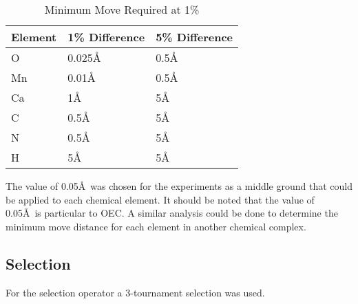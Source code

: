 \begin{table}
\caption{Minimum Move Required at 1\%}
\label{table:minMove}
\centering
\normalsize
\begin{tabular}{ | l | l | l | }
  \hline
    Element & 1\% Difference & 5\% Difference \\ \hline
    O & 0.025\AA & 0.5\AA \\ \hline
    Mn & 0.01\AA & 0.5\AA \\ \hline
    Ca & 1\AA & 5\AA \\ \hline
    C & 0.5\AA & 5\AA \\ \hline
    N & 0.5\AA & 5\AA \\ \hline
    H & 5\AA & 5\AA \\ \hline
\end{tabular}
\end{table}

The value of 0.05\AA\ was chosen for the experiments as a middle ground that could be applied to each chemical element. It should be noted that the value of 0.05\AA\ is particular to OEC. A similar analysis could be done to determine the minimum move distance for each element in another chemical complex.

\subsection{Selection}

For the selection operator a 3-tournament selection was used.